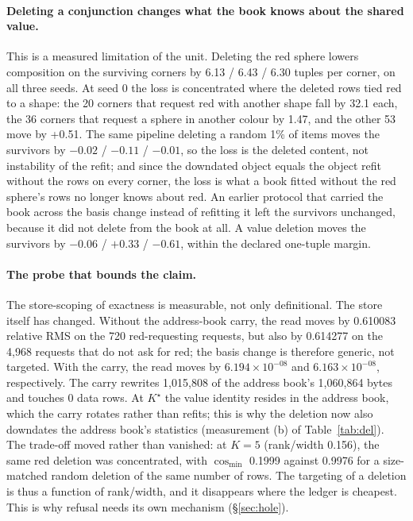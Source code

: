 \documentclass{article} %
\newcommand{\sci}[2]{\ensuremath{#1\times10^{#2}}}
\newcommand{\Kstar}{\ensuremath{K^{\star}}}
\begin{document}
\paragraph{Deleting a conjunction changes what the book knows about the shared value.} This is a
measured limitation of the unit. Deleting the red sphere lowers composition on the surviving corners
by 6.13 / 6.43 / 6.30 tuples per corner, on all three seeds. At seed 0 the loss is concentrated where %
the deleted rows tied red to a shape: the 20 corners that request red with another shape fall by %
32.1 each, the 36 corners that request a sphere in another colour by 1.47, and the other 53 move %
by +0.51. The same pipeline deleting a random 1\% of items moves the survivors by $-0.02$ / %
$-0.11$ / $-0.01$, so the loss is the deleted content, not instability of the refit; and since the %
downdated object equals the object refit without the rows on every corner, the loss is what a book
fitted without the red sphere's rows no longer knows about red. An earlier protocol that carried the
book across the basis change instead of refitting it left the survivors unchanged, because it did
not delete from the book at all. A value deletion moves the survivors by $-0.06$ / $+0.33$ / %
$-0.61$, within the declared one-tuple margin. %

\paragraph{The probe that bounds the claim.} The store-scoping of exactness is measurable, not
only definitional.
The store itself has changed. Without the address-book carry, the read moves by 0.610083
relative RMS on the 720 red-requesting requests, but also by 0.614277 on the 4,968 requests
that do not ask for red; the basis change is therefore generic, not targeted. With the carry,
the read moves by \sci{6.194}{-08} and \sci{6.163}{-08}, respectively. The carry rewrites
1,015,808 of the address book's 1,060,864 bytes and touches 0 data rows. %
At $\Kstar$ the value identity
resides in the address book, which the carry rotates rather than refits; this is why the deletion
now also downdates the address book's statistics (measurement (b) of Table~\ref{tab:del}). The trade-off moved
rather than vanished: at $K=5$ (rank/width 0.156), the same red deletion was concentrated, with
$\cos_{\min}$ 0.1999 against 0.9976 for a size-matched random deletion of the same number of
rows. %
The targeting of a deletion is thus a function of rank/width, and it disappears where the ledger
is cheapest. This is why refusal needs its own mechanism (\S\ref{sec:hole}).
\end{document}
